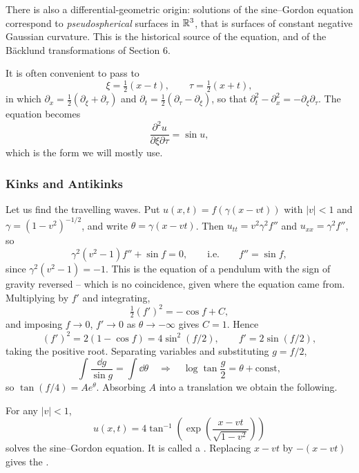 \documentclass[a4paper]{scrartcl}
\begin{document}
There is also a differential-geometric origin: solutions of the sine--Gordon equation correspond to \emph{pseudospherical} surfaces in $\mathbb{R}^3$, that is surfaces of constant negative Gaussian curvature. This is the historical source of the equation, and of the B\"acklund transformations of Section 6.

It is often convenient to pass to 
$$
\xi = \tfrac{1}{2}(x - t), \qquad \tau = \tfrac{1}{2}(x+t),
$$
in which $\partial_x = \frac{1}{2}(\partial_\xi + \partial_\tau)$ and $\partial_t = \frac{1}{2}(\partial_\tau - \partial_\xi)$, so that $\partial_t^2 - \partial_x^2 = -\partial_\xi\partial_\tau$. The equation becomes
$$
\frac{\partial^2u}{\partial\xi\partial\tau} = \sin u,
$$
which is the form we will mostly use.

\subsubsection{Kinks and Antikinks}

Let us find the travelling waves. Put $u(x,t) = f(\gamma(x - vt))$ with $|v|<1$ and $\gamma = (1-v^2)^{-1/2}$, and write $\theta = \gamma(x-vt)$. Then $u_{tt} = v^2\gamma^2f''$ and $u_{xx} = \gamma^2f''$, so
$$
\gamma^2(v^2-1)f'' + \sin f = 0, \qquad\text{i.e.}\qquad f'' = \sin f,
$$
since $\gamma^2(v^2-1) = -1$. This is the equation of a pendulum with the sign of gravity reversed -- which is no coincidence, given where the equation came from. Multiplying by $f'$ and integrating,
$$
\tfrac{1}{2}(f')^2 = -\cos f + C,
$$
and imposing $f\to0$, $f'\to0$ as $\theta\to-\infty$ gives $C = 1$. Hence
$$
(f')^2 = 2(1-\cos f) = 4\sin^2(f/2), \qquad f' = 2\sin(f/2),
$$
taking the positive root. Separating variables and substituting $g = f/2$,
$$
\int\frac{\dd g}{\sin g} = \int\dd\theta \quad\Longrightarrow\quad \log\tan\frac{g}{2} = \theta + \text{const},
$$
so $\tan(f/4) = Ae^{\theta}$. Absorbing $A$ into a translation we obtain the following.

\begin{proposition}
	For any $|v|<1$,
	$$
	u(x,t) = 4\tan^{-1}\left(\exp\left(\frac{x - vt}{\sqrt{1-v^2}}\right)\right)
	$$
	solves the sine--Gordon equation. It is called a . Replacing $x - vt$ by $-(x-vt)$ gives the .
\end{proposition}
\end{document}
